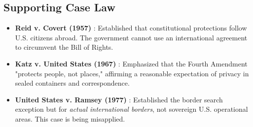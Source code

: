 \subsection{Supporting Case Law}
\begin{itemize}
    \item \textbf{Reid v. Covert (1957)} \cite{reid1957}: Established that constitutional protections follow U.S. citizens abroad. The government cannot use an international agreement to circumvent the Bill of Rights.
    \item \textbf{Katz v. United States (1967)} \cite{katz1967}: Emphasized that the Fourth Amendment "protects people, not places," affirming a reasonable expectation of privacy in sealed containers and correspondence.
    \item \textbf{United States v. Ramsey (1977)} \cite{ramsey1977}: Established the border search exception but for \textit{actual international borders}, not sovereign U.S. operational areas. This case is being misapplied.
\end{itemize}
